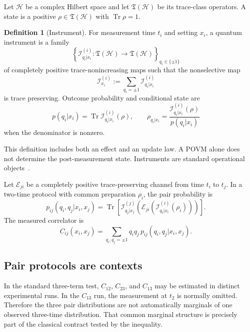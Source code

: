 \documentclass[11pt]{article}
\theoremstyle{definition}
\newtheorem{definition}{Definition}
\theoremstyle{remark}
\begin{document}
Let $\mathcal H$ be a complex Hilbert space and let $\mathfrak T(\mathcal H)$
be its trace-class operators.  A state is a positive
$\rho\in\mathfrak T(\mathcal H)$ with $\operatorname{Tr}\rho=1$.

\begin{definition}[Instrument]
For measurement time $t_i$ and setting $x_i$, a quantum instrument is a
family
\[
 \left\{\mathcal I^{(i)}_{q_i|x_i}:
 \mathfrak T(\mathcal H)\longrightarrow\mathfrak T(\mathcal H)
 \right\}_{q_i\in\{\pm1\}}
\]
of completely positive trace-nonincreasing maps such that the nonselective
map
\[
 \mathcal I^{(i)}_{x_i}:=
 \sum_{q_i=\pm1}\mathcal I^{(i)}_{q_i|x_i}
\]
is trace preserving.  Outcome probability and conditional state are
\[
 p(q_i|x_i)=\operatorname{Tr}\mathcal I^{(i)}_{q_i|x_i}(\rho),
 \qquad
 \rho_{q_i|x_i}
 =\frac{\mathcal I^{(i)}_{q_i|x_i}(\rho)}{p(q_i|x_i)}
\]
when the denominator is nonzero.
\end{definition}

This definition includes both an effect and an update law.  A POVM alone does
not determine the post-measurement state.  Instruments are standard
operational objects~\cite{DaviesLewis1970}.

Let $\mathcal E_{ji}$ be a completely positive trace-preserving channel from
time $t_i$ to $t_j$.  In a two-time protocol with common preparation
$\rho_i$, the pair probability is
\begin{equation}
p_{ij}(q_i,q_j|x_i,x_j)
=
\operatorname{Tr}\!\left[
\mathcal I^{(j)}_{q_j|x_j}\!\left(
\mathcal E_{ji}\!\left(
\mathcal I^{(i)}_{q_i|x_i}(\rho_i)
\right)\right)
\right].
\label{eq:pair}
\end{equation}
The measured correlator is
\begin{equation}
C_{ij}(x_i,x_j)
=
\sum_{q_i,q_j=\pm1}q_iq_j\,
p_{ij}(q_i,q_j|x_i,x_j).
\label{eq:correlator}
\end{equation}

\subsection{Pair protocols are contexts}

In the standard three-term test, $C_{12}$, $C_{23}$, and $C_{13}$ may be
estimated in distinct experimental runs.  In the $C_{13}$ run, the
measurement at $t_2$ is normally omitted.  Therefore the three pair
distributions are not automatically marginals of one observed three-time
distribution.  That common marginal structure is precisely part of the
classical contract tested by the inequality.
\end{document}
